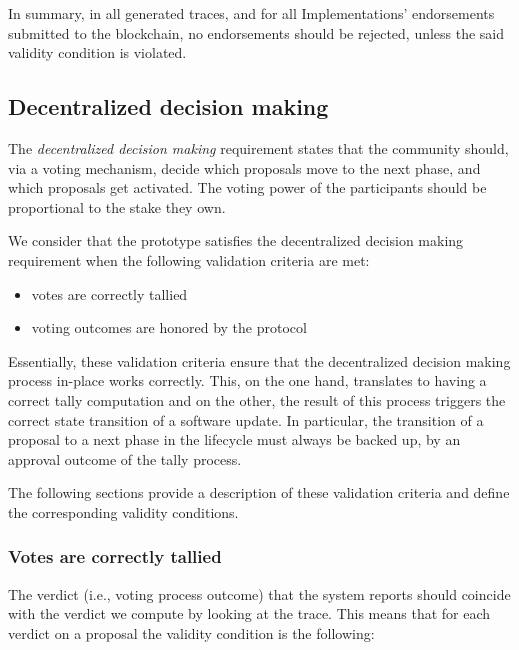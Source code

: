 In summary, in all generated traces, and for all
Implementations' endorsements submitted to the blockchain, no endorsements
should be rejected, unless the said validity condition is violated.

\subsection{Decentralized decision making}\label{sec:dec_dec_making}
The \emph{decentralized decision making} requirement states that the community
should, via a voting mechanism, decide which proposals move to the next phase,
and which proposals get activated. The voting power of the participants should
be proportional to the stake they own.

We consider that the prototype satisfies  the decentralized
decision making requirement when the following validation criteria are met:

\begin{itemize}
	\item votes are correctly tallied
	\item voting outcomes are honored by the protocol
\end{itemize}

Essentially, these validation criteria ensure that the decentralized decision
making process in-place works correctly. This, on the one hand, translates to
having a correct tally computation and on the other, the result of this process
triggers the correct state transition of a software update. In
particular, the transition of a proposal to a next phase in the lifecycle must
always be backed up, by an approval outcome of the tally process.

The following sections provide a description of these validation criteria and
define the corresponding validity conditions.

\subsubsection{Votes are correctly 
tallied}\label{vc:votes_are_correctly_tallied}
The verdict (i.e., voting process outcome) that the system reports should
coincide with the verdict we compute by looking at the trace. This means that
for each verdict on a proposal the validity condition is the following:

